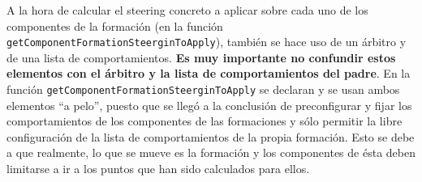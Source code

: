 A la hora de calcular el steering concreto a aplicar sobre cada uno de los componentes de la formación (en la función \texttt{getComponentFormationSteerginToApply}), también se hace uso de un árbitro y de una lista de comportamientos. \textbf{Es muy importante no confundir estos elementos con el árbitro y la lista de comportamientos del padre}. En la función \texttt{getComponentFormationSteerginToApply} se declaran y se usan ambos elementos ``a pelo'', puesto que se llegó a la conclusión de preconfigurar y fijar los comportamientos de los componentes de las formaciones y sólo permitir la libre configuración de la lista de comportamientos de la propia formación. Esto se debe a que realmente, lo que se mueve es la formación y los componentes de ésta deben limitarse a ir a los puntos que han sido calculados para ellos.

